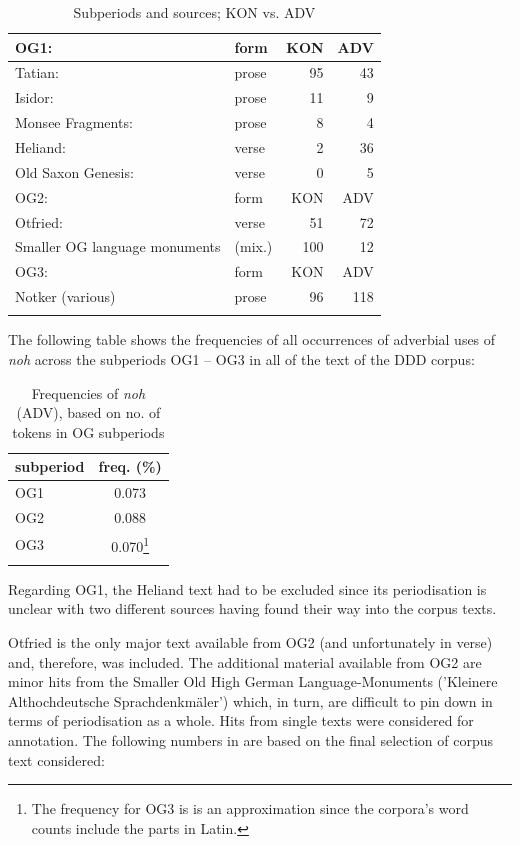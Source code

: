 \documentclass[output=paper,
modfonts
]{langscibook}
\begin{document}
\begin{table}
\begin{tabular}{llrr}
\lsptoprule
{OG1:} & {form} & {KON} & {ADV}  \\
\midrule
Tatian: & prose & 95 & 43  \\
Isidor: & prose & 11 & 9 \\
Monsee Fragments: & prose & 8 & 4 \\
Heliand: & verse & 2 & 36 \\ %
Old Saxon Genesis: & verse & 0 & 5 \\
\midrule
{OG2:} & {form} & {KON} & {ADV}  \\
\midrule
Otfried: & verse & 51 & 72 \\
Smaller OG language monuments & (mix.) & 100 & 12 \\
\midrule
{OG3:} & {form} & {KON} & {ADV}  \\
\midrule
Notker (various) & prose & 96 & 118 \\
\lspbottomrule
\end{tabular}
\caption{Subperiods and sources; KON vs. ADV}
\label{tab:overview_subperiods_and_sources}
\end{table}

\noindent The following table shows the frequencies of all occurrences of adverbial uses of \textit{noh} across the subperiods OG1 -- OG3 in all of the text of the DDD corpus:

\begin{table}
\begin{tabular}{lc}
\lsptoprule
subperiod	& freq. (\%)	\\
\midrule
OG1		& 0.073 \\
OG2		& 0.088 \\
OG3		& 0.070\footnote{The frequency for OG3 is is an approximation since the corpora's word counts include the parts in Latin.}\\
\lspbottomrule
\end{tabular}
\caption{Frequencies of \textit{noh} (ADV), based on no. of tokens in OG subperiods}
\label{tab:frequencies_of_noh}
\end{table}

\noindent Regarding OG1, the Heliand text had to be excluded since its periodisation is unclear with two different sources having found their way into the corpus texts.

Otfried is the only major text available from OG2 (and unfortunately in verse) and, therefore, was included. The additional material available from OG2 are minor hits from the Smaller Old High German Language-Monuments ('Kleinere Althochdeutsche Sprachdenkmäler') which, in turn, are difficult to pin down in terms of periodisation as a whole. Hits from single texts were considered for annotation. The following numbers in  are based on the final selection of corpus text considered:
\end{document}
